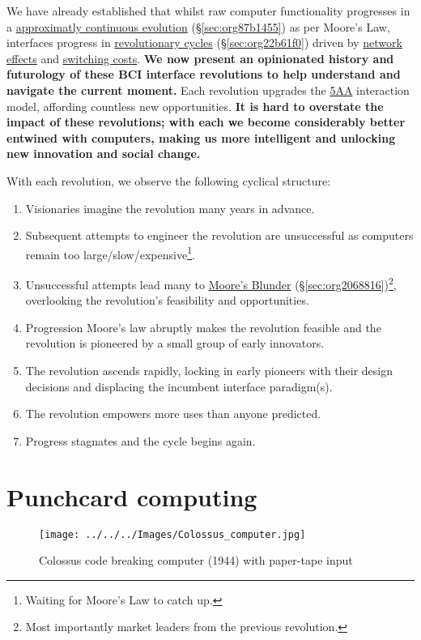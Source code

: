 \documentclass[logo,bsc,singlespacing,parskip]{infthesis}
\begin{document}
We have already established that whilst raw computer functionality progresses in a \hyperref[sec:org87b1455]{approximatly continuous evolution} (\S \ref{sec:org87b1455}) as per Moore's Law, interfaces progress in \hyperref[sec:org22b61f0]{revolutionary cycles} (\S \ref{sec:org22b61f0}) driven by \hyperref[network effects]{network effects} and \hyperref[switching costs]{switching costs}.
\textbf{We now present an opinionated history and futurology of these BCI interface revolutions to help understand and navigate the current moment.}
Each revolution upgrades the \hyperref[org7b75b93]{5AA} interaction model, affording countless new opportunities.
\textbf{It is hard to overstate the impact of these revolutions; with each we become considerably better entwined with computers, making us more intelligent and unlocking new innovation and social change.}

With each revolution, we observe the following cyclical structure:

\begin{enumerate}
\item Visionaries imagine the revolution many years in advance.
\item Subsequent attempts to engineer the revolution are unsuccessful as computers remain too large/slow/expensive\footnote{Waiting for Moore's Law to catch up.}.
\item Unsuccessful attempts lead many to \hyperref[sec:org2068816]{Moore's Blunder} (\S \ref{sec:org2068816})\footnote{Most importantly market leaders from the previous revolution.}, overlooking the revolution's feasibility and opportunities.
\item Progression Moore's law abruptly makes the revolution feasible and the revolution is pioneered by a small group of early innovators.
\item The revolution ascends rapidly, locking in early pioneers with their design decisions and displacing the incumbent interface paradigm(s).
\item The revolution empowers more uses than anyone predicted.
\item Progress stagnates and the cycle begins again.
\end{enumerate}
\section{Punchcard computing}
\label{sec:orgcaf6f05}
\begin{wrapfigure}{r}{0.6\textwidth}
\centering
\texttt{[image: ../../../Images/Colossus\_computer.jpg]}
\caption[Colossus code breaking computer (1944)]{Colossus code breaking computer (1944) with paper-tape input}
\end{wrapfigure}
\end{document}
